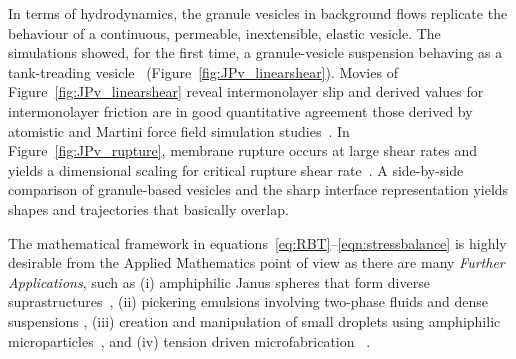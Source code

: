 In terms of hydrodynamics, the granule vesicles in background flows
replicate the behaviour of a continuous, permeable, inextensible,
elastic vesicle. The simulations showed, for the first time, a
granule-vesicle suspension behaving as a tank-treading
vesicle~\cite{Finken2008, Shaqfeh11} (Figure~\ref{fig:JPv_linearshear}).
Movies of Figure~\ref{fig:JPv_linearshear} reveal intermonolayer slip
and derived values for intermonolayer friction are in good quantitative
agreement those derived by atomistic and Martini force field simulation
studies~\cite{WuoEd06, denOtter2007, SHKULIPA2005823, Zgorski2019}. In
Figure~\ref{fig:JPv_rupture}, membrane rupture occurs at large shear
rates and yields a dimensional scaling for critical rupture shear
rate~\cite{VLAHOVSKA2009775, keller_skalak_1982}. A side-by-side
comparison of granule-based vesicles and the sharp interface
representation yields shapes and trajectories that basically overlap.

The mathematical framework in
equations~\eqref{eq:RBT}--\eqref{eqn:stressbalance} is highly desirable
from the Applied Mathematics point of view as there are many
\emph{Further Applications}, such as (i) amphiphilic Janus spheres that
form diverse suprastructures~\cite{HaBr20, McBr21, Bradley2017}, (ii)
pickering emulsions involving two-phase fluids and dense suspensions
\cite{Bradley2016}, (iii) creation and manipulation of small droplets
using amphiphilic microparticles~\cite{Ha2022SurfaceEM,
Ha2020MinimalSC}, and (iv) tension driven microfabrication
~\cite{Dasgupta2017, Leong2007, Reynolds2019, Cho2010,
Zeng20223DprintedMT, Russell2016EnergyLF}.

